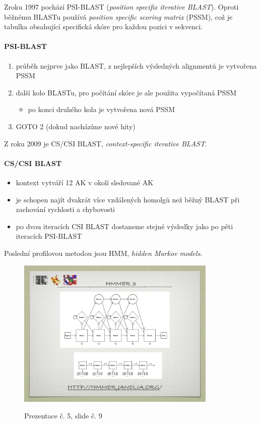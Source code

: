 \documentclass[DIV=8]{scrreprt}
\begin{document}
Zroku 1997 pochází PSI-BLAST (\emph{position specifix iterative BLAST}). Oproti běžnému BLASTu používá \emph{position specific scoring matrix} (PSSM), což je tabulka obsahující specifická skóre pro každou pozici v sekvenci.

\paragraph{PSI-BLAST}
\begin{enumerate}[nosep]
    \item průběh nejprve jako BLAST, z nejlepších výsledných alignmentů je vytvořena PSSM
    \item další kolo BLASTu, pro počítání skóre je ale použita vypočítaná PSSM
\begin{itemize}[nosep]
    \item po konci druhého kola je vytvořena nová PSSM
\end{itemize}

    \item GOTO 2 (dokud nacházíme nové hity)
\end{enumerate}



Z roku 2009 je CS/CSI BLAST, \emph{context-specific iterative BLAST}.

\paragraph{CS/CSI BLAST}
\begin{itemize}[nosep]
    \item kontext vytváří 12 AK v okolí sledované AK
    \item je schopen najít dvakrát více vzdálených homolgů než běžný BLAST při zachování rychlosti a chybovosti
    \item po dvou iteracích CSI BLAST dostaneme stejné výsledky jako po pěti iteracích PSI-BLAST
\end{itemize}



Poslední profilovou metodou jsou HMM, \emph{hidden Markov models}.

\begin{figure}
    \caption{Prezentace č. 5, slide č. 9}
    \includegraphics[width=0.85\textwidth]{slides-5/slide-9.jpg}
    \centering
    \label{slides-5-slide-9}
\end{figure}
\end{document}
